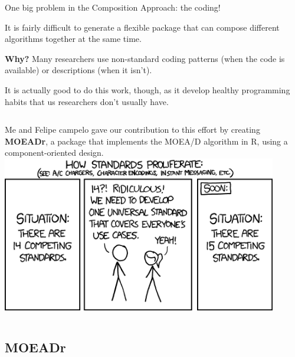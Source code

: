 \documentclass[aspectratio=169]{beamer}
\begin{document}
\begin{frame}{One big problem in the Composition Approach: the coding!}

  It is fairly difficult to generate a flexible package that can
  compose different algorithms together at the same time.\medskip

  {\bf Why?} Many researchers use non-standard coding patterns (when
  the code is available) or descriptions (when it isn't).\medskip

  It is actually good to do this work, though, as it develop healthy
  programming habits that us researchers don't usually have.

  \begin{columns}
    Me and Felipe campelo gave our contribution to this effort by creating {\bf MOEADr},
    a package that implements the MOEA/D algorithm in R, using a component-oriented design.
    \includegraphics[width=0.9\textwidth]{img/xkcd_927_standards.png}
  \end{columns}
\end{frame}



\subsection{MOEADr}
\end{document}
